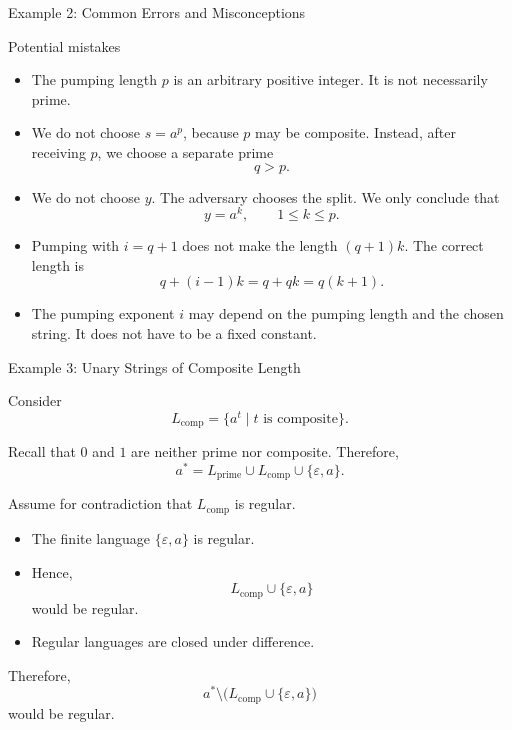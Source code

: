 \documentclass[10pt,aspectratio=169]{beamer}
\newcommand{\eps}{\varepsilon}
\begin{document}
\begin{frame}{Example 2: Common Errors and Misconceptions}

\small
\begin{alertblock}{Potential mistakes}
\begin{itemize}
    \item The pumping length \(p\) is an arbitrary positive integer.
    It is not necessarily prime.

    \item We do not choose \(s=a^p\), because \(p\) may be composite.
    Instead, after receiving \(p\), we choose a separate prime
    \[
    q>p.
    \]

    \item We do not choose \(y\). The adversary chooses the split.
    We only conclude that
    \[
    y=a^k,\qquad 1\leq k\leq p.
    \]

    \item Pumping with \(i=q+1\) does not make the length
    \((q+1)k\). The correct length is
    \[
    q+(i-1)k=q+qk=q(k+1).
    \]

    \item The pumping exponent \(i\) may depend on the pumping length
    and the chosen string. It does not have to be a fixed constant.
\end{itemize}
\end{alertblock}

\end{frame}

\begin{frame}{Example 3: Unary Strings of Composite Length}

\small
Consider
\[
L_{\mathrm{comp}}
=
\{a^t\mid t\text{ is composite}\}.
\]

Recall that \(0\) and \(1\) are neither prime nor composite. Therefore,
\[
a^*
=
L_{\mathrm{prime}}
\cup
L_{\mathrm{comp}}
\cup
\{\eps,a\}.
\]

Assume for contradiction that \(L_{\mathrm{comp}}\) is regular.

\begin{itemize}
    \item The finite language \(\{\eps,a\}\) is regular.

    \item Hence,
    \[
    L_{\mathrm{comp}}\cup\{\eps,a\}
    \]
    would be regular.

    \item Regular languages are closed under difference.
\end{itemize}

Therefore,
\[
a^*\setminus
\bigl(L_{\mathrm{comp}}\cup\{\eps,a\}\bigr)
\]
would be regular.

\end{frame}
\end{document}
